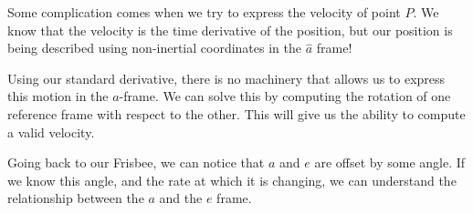 \documentclass[10pt, openany, titlepage]{book}
\theoremstyle{definition}
\begin{document}
Some complication comes when we try to express the velocity of point $P$. We know that the velocity is the time derivative of the position, but our position is being described using non-inertial coordinates in the $\hat{a}$ frame!

Using our standard derivative, there is no machinery that allows us to express this motion in the $a$-frame. We can solve this by computing the rotation of one reference frame with respect to the other. This will give us the ability to compute a valid velocity.

Going back to our Frisbee, we can notice that $a$ and $e$ are offset by some angle. If we know this angle, and the rate at which it is changing, we can understand the relationship between the $a$ and the $e$ frame.
\begin{figure}[H]
    \centering

    


\begin{tikzpicture}[x=0.75pt,y=0.75pt,yscale=-1,xscale=1]


\end{tikzpicture}
\end{figure}
\end{document}
